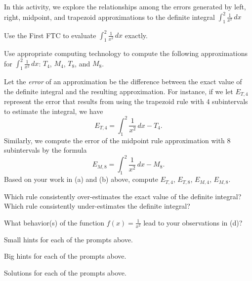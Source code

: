 \begin{activity} \label{A:5.6.1}  In this activity, we explore the relationships among the errors generated by left, right, midpoint, and trapezoid approximations to the definite integral $\int_1^2 \frac{1}{x^2} \, dx$ 
\ba
	\item Use the First FTC to evaluate $\int_1^2 \frac{1}{x^2} \, dx$ exactly.
	\item Use appropriate computing technology to compute the following approximations for $\int_1^2 \frac{1}{x^2} \, dx$:  $T_4$, $M_4$, $T_8$, and $M_8$.  
	\item Let the \emph{error}    of an approximation be the difference between the exact value of the definite integral and the resulting approximation.  For instance, if we let $E_{T,4}$ represent the error that results from using the trapezoid rule with 4 subintervals to estimate the integral, we have 
	$$E_{T,4} = \int_1^2 \frac{1}{x^2} \, dx -  T_4.$$
	Similarly, we compute the error of the midpoint rule approximation with 8 subintervals by the formula
	$$E_{M,8} = \int_1^2 \frac{1}{x^2} \, dx -  M_8.$$
	Based on your work in (a) and (b) above, compute $E_{T,4}$, $E_{T,8}$, $E_{M,4}$, $E_{M,8}$.
	\item Which rule consistently over-estimates the exact value of the definite integral?  Which rule consistently under-estimates the definite integral?
	\item What behavior(s) of the function $f(x) = \frac{1}{x^2}$ lead to your observations in (d)?
\ea
\end{activity}
\begin{smallhint}
\ba
	\item Small hints for each of the prompts above.
\ea
\end{smallhint}
\begin{bighint}
\ba
	\item Big hints for each of the prompts above.
\ea
\end{bighint}
\begin{activitySolution}
\ba
	\item Solutions for each of the prompts above.
\ea
\end{activitySolution}
\aftera